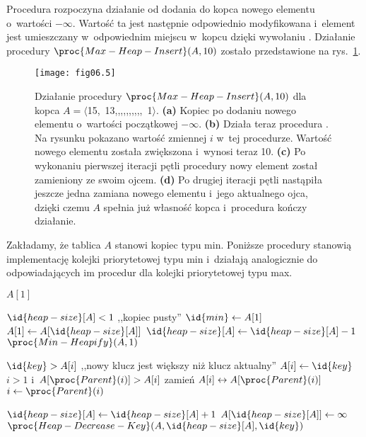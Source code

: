 \exercise %
Procedura  rozpoczyna działanie od dodania do kopca nowego elementu o~wartości $-\infty$. Wartość ta jest następnie odpowiednio modyfikowana i~element jest umieszczany w~odpowiednim miejscu w~kopcu dzięki wywołaniu . Działanie procedury $\proc{Max-Heap-Insert}(A,10)$ zostało przedstawione na rys.~\ref{fig:6.5-2}.
\begin{figure}[ht]
	\begin{center}
		\texttt{[image: fig06.5]}
	\end{center}
	\caption{Działanie procedury $\proc{Max-Heap-Insert}(A,10)$ dla kopca $A=\langle$15,\!~13,,,,,,,,,,\!~1$\rangle$. {\sffamily\bfseries(a)} Kopiec po dodaniu nowego elementu o~wartości początkowej $-\infty$. {\sffamily\bfseries(b)} Działa teraz procedura . Na rysunku pokazano wartość zmiennej $i$ w~tej procedurze. Wartość nowego elementu została zwiększona i~wynosi teraz 10. {\sffamily\bfseries(c)} Po wykonaniu pierwszej iteracji pętli  procedury  nowy element został zamieniony ze swoim ojcem. {\sffamily\bfseries(d)} Po drugiej iteracji pętli nastąpiła jeszcze jedna zamiana nowego elementu i~jego aktualnego ojca, dzięki czemu $A$ spełnia już własność kopca i~procedura kończy działanie.} \label{fig:6.5-2}
\end{figure}

\exercise %
Zakładamy, że tablica $A$ stanowi kopiec typu min. Poniższe procedury stanowią implementację kolejki priorytetowej typu min i~działają analogicznie do odpowiadających im procedur dla kolejki priorytetowej typu max.
\begin{codebox}
\li	\Return $A[1]$
\end{codebox}
\begin{codebox}
\li	\If $\id{heap-size}[A]<1$
\li		\Then \Error ,,kopiec pusty''
		\End
\li	$\id{min}\gets A[1]$
\li	$A[1]\gets A[\id{heap-size}[A]]$
\li	$\id{heap-size}[A]\gets\id{heap-size}[A]-1$
\li	$\proc{Min-Heapify}(A,1)$
\li	\Return {}
\end{codebox}
\begin{codebox}
\li	\If $\id{key}>A[i]$
\li		\Then \Error ,,nowy klucz jest większy niż klucz aktualny''
		\End
\li	$A[i]\gets\id{key}$
\li	\While $i>1$ i~$A[\proc{Parent}(i)]>A[i]$
\li		\Do
			zamień $A[i]\leftrightarrow A[\proc{Parent}(i)]$
\li			$i\gets\proc{Parent}(i)$
		\End
\end{codebox}
\begin{codebox}
\li	$\id{heap-size}[A]\gets\id{heap-size}[A]+1$
\li	$A[\id{heap-size}[A]]\gets\infty$
\li	$\proc{Heap-Decrease-Key}(A,\id{heap-size}[A],\id{key})$
\end{codebox}

